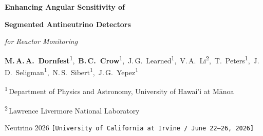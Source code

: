 \centering
\color{white}
{\veryHuge\bfseries Enhancing Angular Sensitivity of\par}
\vspace{0.15cm}
{\veryHuge\bfseries Segmented Antineutrino Detectors\par}
\vspace{0.35cm}
{\Large\itshape for Reactor Monitoring\par}
\vspace{0.55cm}
{\normalsize\color{UHGreen!10!white}%
  \textbf{M.\,A.\,A.~Dornfest}\textsuperscript{1},\,
  \textbf{B.\,C.~Crow}\textsuperscript{1},\,
  J.\,G.~Learned\textsuperscript{1},\,
  V.\,A.~Li\textsuperscript{2},\,
  T.~Peters\textsuperscript{1},\,
  J.\,D.~Seligman\textsuperscript{1},\,
  N.\,S.~Sibert\textsuperscript{1},\,
  J.\,G.~Yepez\textsuperscript{1}\par
   \textsuperscript{1}\,Department of Physics and Astronomy, University of Hawai\textquoteright i at M\=anoa\par
  \textsuperscript{2}\,Lawrence Livermore National Laboratory\par
  Neutrino 2026 \texttt{[University of California at Irvine / June 22--26, 2026]}\par
}
